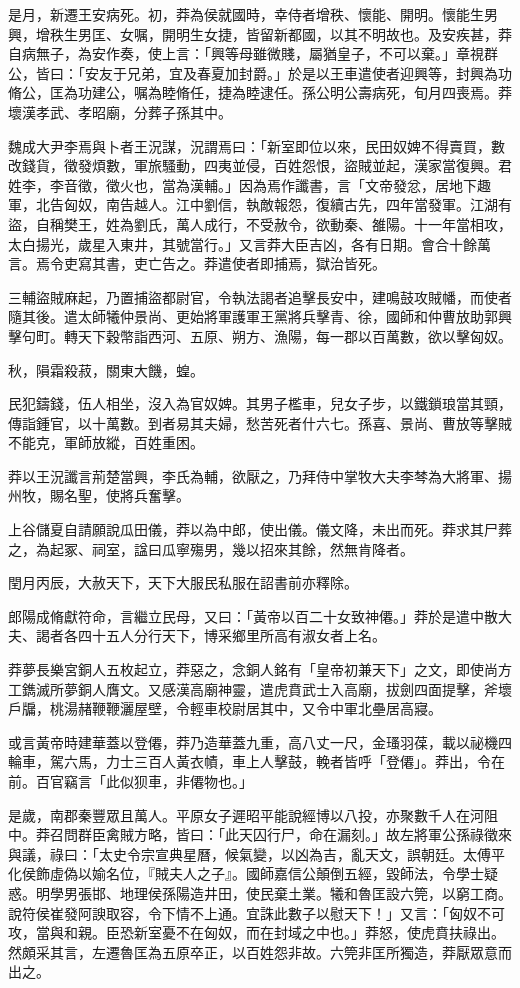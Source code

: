\begin{pinyinscope}
是月，新遷王安病死。初，莽為侯就國時，幸侍者增秩、懷能、開明。懷能生男興，增秩生男匡、女嘱，開明生女捷，皆留新都國，以其不明故也。及安疾甚，莽自病無子，為安作奏，使上言：「興等母雖微賤，屬猶皇子，不可以棄。」章視群公，皆曰：「安友于兄弟，宜及春夏加封爵。」於是以王車遣使者迎興等，封興為功脩公，匡為功建公，嘱為睦脩任，捷為睦逮任。孫公明公壽病死，旬月四喪焉。莽壞漢孝武、孝昭廟，分葬子孫其中。

魏成大尹李焉與卜者王況謀，況謂焉曰：「新室即位以來，民田奴婢不得賣買，數改錢貨，徵發煩數，軍旅騷動，四夷並侵，百姓怨恨，盜賊並起，漢家當復興。君姓李，李音徵，徵火也，當為漢輔。」因為焉作讖書，言「文帝發忿，居地下趣軍，北告匈奴，南告越人。江中劉信，執敵報怨，復續古先，四年當發軍。江湖有盜，自稱樊王，姓為劉氏，萬人成行，不受赦令，欲動秦、雒陽。十一年當相攻，太白揚光，歲星入東井，其號當行。」又言莽大臣吉凶，各有日期。會合十餘萬言。焉令吏寫其書，吏亡告之。莽遣使者即捕焉，獄治皆死。

三輔盜賊麻起，乃置捕盜都尉官，令執法謁者追擊長安中，建鳴鼓攻賊幡，而使者隨其後。遣太師犧仲景尚、更始將軍護軍王黨將兵擊青、徐，國師和仲曹放助郭興擊句町。轉天下穀幣詣西河、五原、朔方、漁陽，每一郡以百萬數，欲以擊匈奴。

秋，隕霜殺菽，關東大饑，蝗。

民犯鑄錢，伍人相坐，沒入為官奴婢。其男子檻車，兒女子步，以鐵鎖琅當其頸，傳詣鍾官，以十萬數。到者易其夫婦，愁苦死者什六七。孫喜、景尚、曹放等擊賊不能克，軍師放縱，百姓重困。

莽以王況讖言荊楚當興，李氏為輔，欲厭之，乃拜侍中掌牧大夫李棽為大將軍、揚州牧，賜名聖，使將兵奮擊。

上谷儲夏自請願說瓜田儀，莽以為中郎，使出儀。儀文降，未出而死。莽求其尸葬之，為起冢、祠室，諡曰瓜寧殤男，幾以招來其餘，然無肯降者。

閏月丙辰，大赦天下，天下大服民私服在詔書前亦釋除。

郎陽成脩獻符命，言繼立民母，又曰：「黃帝以百二十女致神僊。」莽於是遣中散大夫、謁者各四十五人分行天下，博采鄉里所高有淑女者上名。

莽夢長樂宮銅人五枚起立，莽惡之，念銅人銘有「皇帝初兼天下」之文，即使尚方工鐫滅所夢銅人膺文。又感漢高廟神靈，遣虎賁武士入高廟，拔劍四面提擊，斧壞戶牖，桃湯赭鞭鞭灑屋壁，令輕車校尉居其中，又令中軍北壘居高寢。

或言黃帝時建華蓋以登僊，莽乃造華蓋九重，高八丈一尺，金瑵羽葆，載以祕機四輪車，駕六馬，力士三百人黃衣幘，車上人擊鼓，輓者皆呼「登僊」。莽出，令在前。百官竊言「此似狈車，非僊物也。」

是歲，南郡秦豐眾且萬人。平原女子遲昭平能說經博以八投，亦聚數千人在河阻中。莽召問群臣禽賊方略，皆曰：「此天囚行尸，命在漏刻。」故左將軍公孫祿徵來與議，祿曰：「太史令宗宣典星曆，候氣變，以凶為吉，亂天文，誤朝廷。太傅平化侯飾虛偽以媮名位，『賊夫人之子』。國師嘉信公顛倒五經，毀師法，令學士疑惑。明學男張邯、地理侯孫陽造井田，使民棄土業。犧和魯匡設六筦，以窮工商。說符侯崔發阿諛取容，令下情不上通。宜誅此數子以慰天下！」又言：「匈奴不可攻，當與和親。臣恐新室憂不在匈奴，而在封域之中也。」莽怒，使虎賁扶祿出。然頗采其言，左遷魯匡為五原卒正，以百姓怨非故。六筦非匡所獨造，莽厭眾意而出之。


\end{pinyinscope}
